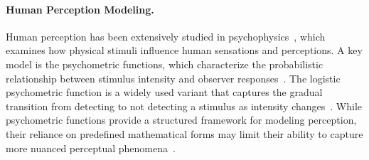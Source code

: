 

\paragraph{Human Perception Modeling.}
Human perception has been extensively studied in psychophysics~\cite{prins2016psychophysics}, which examines how physical stimuli influence human sensations and perceptions.
A key model is the psychometric functions, which characterize the probabilistic relationship between stimulus intensity and observer responses~\cite{wichmann2001psychometric,klein2001measuring}. The logistic psychometric function is a widely used variant that captures the gradual transition from detecting to not detecting a stimulus as intensity changes~\cite{treutwein1999fitting}. While psychometric functions provide a structured framework for modeling perception, their reliance on predefined mathematical forms may limit their ability to capture more nuanced perceptual phenomena~\cite{morgan2012observers,garcia2013shifts}.


